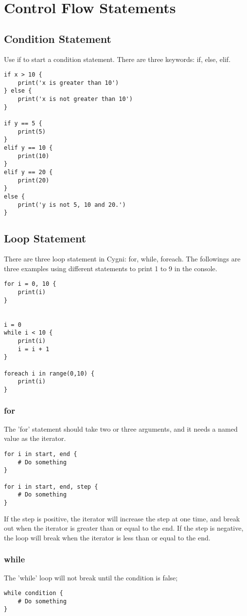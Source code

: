 \chapter{Control Flow Statements}
\section{Condition Statement}
Use if to start a condition statement. There are three keywords: if, else, elif.
\begin{lstlisting}
if x > 10 {
	print('x is greater than 10')
} else {
	print('x is not greater than 10')
}

if y == 5 {
	print(5)
}
elif y == 10 {
	print(10)
}
elif y == 20 {
	print(20)
}
else {
	print('y is not 5, 10 and 20.')
}
\end{lstlisting}

\section{Loop Statement}
	There are three loop statement in Cygni: for, while, foreach.
	The followings are three examples using different statements to print 1 to 9 in the console.
\begin{lstlisting}
for i = 0, 10 {
	print(i)
}


i = 0
while i < 10 {
	print(i)
	i = i + 1
}

foreach i in range(0,10) {
	print(i)
}
\end{lstlisting}

\subsection{for}
	The 'for' statement should take two or three arguments, and it needs a named value as the iterator.
\begin{lstlisting}
for i in start, end {
	# Do something
}

for i in start, end, step {
	# Do something
}
\end{lstlisting}
	If the step is positive, the iterator will increase the step at one time, and break out when the iterator is greater than or equal to the end. If the step is negative, the loop will break when the iterator is less than or equal to the end.
\subsection{while}
The 'while' loop will not break until the condition is false;
\begin{lstlisting}
while condition {
	# Do something
}
\end{lstlisting}

